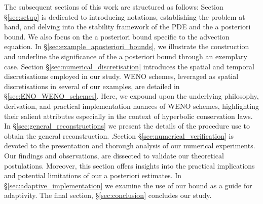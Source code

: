 \documentclass[final]{amsart}
\numberwithin{equation}{section}
\begin{document}
The subsequent sections of this work are structured as follows:
Section \S\ref{sec:setup} is dedicated to introducing notations,
establishing the problem at hand, and delving into the stability
framework of the PDE and the a posteriori bound. We also focus on the
a posteriori bound specific to the advection equation. In
\S\ref{sec:example_aposteriori_bounds}, we illustrate the construction
and underline the significance of the a posteriori bound through an
exemplary case. Section \S\ref{sec:numerical_discretisation}
introduces the spatial and temporal discretisations employed in our
study. WENO schemes, leveraged as spatial discretisations in several
of our examples, are detailed in
\S\ref{sec:ENO_WENO_schemes}. Here, we expound upon the underlying
philosophy, derivation, and practical implementation nuances of WENO
schemes, highlighting their salient attributes especially in the
context of hyperbolic conservation laws.  In \S\ref{sec:general_reconstructions} we present the details of the procedure use to obtain the general reconstruction. .Section
\S\ref{sec:numerical_verification} is devoted to the presentation and thorough
analysis of our numerical experiments. Our findings and observations,
are dissected to validate our theoretical postulations. Moreover, this
section offers insights into the practical implications and potential
limitations of our a posteriori estimates.  In \S \ref{sec:adaptive_implementation} we examine the use of our bound as a guide for adaptivity. The final section,
\S\ref{sec:conclusion} concludes our study.
\end{document}
